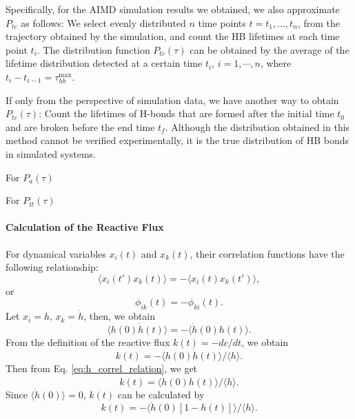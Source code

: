 Specifically, for the AIMD simulation results we obtained, we also approximate $P_{tc}$ as follows: 
We select evenly distributed $n$ time points $t=t_1,...,t_n$, from the trajectory obtained by the simulation, 
and count the HB lifetimes at each time point $t_i$.
The distribution function $P_{tc}(\tau)$ 
can be obtained by the average of the lifetime distribution detected at a certain time $t_i$, $i=1,\cdots, n$, 
where $t_i-t_{i-1} = \tau_{hb}^{\max}$. 

If only from the perspective of simulation data, we have another way to obtain $P_{tc}(\tau)$: 
Count the lifetimes of H-bonds that are formed after the initial time $t_0$ and are broken before the end time $t_f$.
Although the distribution obtained in this method cannot be verified experimentally, 
it is the true distribution of HB bonds in simulated systems. 

For $P_a(\tau)$

For $P_{tt}(\tau)$


\paragraph{Calculation of the Reactive Flux}\label{calc_rf}
For dynamical variables $x_i(t)$ and $x_k(t)$, their correlation functions have the following relationship:\cite{Landau1980}
\begin{equation}
\langle x_i(t') x_k(t)\rangle = -\langle x_i(t) x_k(t')\rangle,
\label{eq:correlation_relation}
\end{equation}
or 
\begin{equation}
\phi_{ik}(t) = -\phi_{ki}(t). \nonumber
\label{eq:correlation_relation2}
\end{equation}
Let $x_i = h$, $x_k = \dot h$,
then, we obtain
\begin{equation}
\langle h(0) \dot{h}(t)\rangle=-\langle\dot{h}(0) h(t)\rangle. 
\label{eq:h_correl_relation}
\end{equation}
From the definition of the reactive flux $k(t) = -dc/dt$, we obtain 
\begin{equation}
k(t)=-\langle h(0) \dot{h}(t)\rangle /\langle h\rangle. 
\label{eq:rf1}
\end{equation}
Then from Eq. \ref{eq:h_correl_relation},
we get 
\begin{equation}
k(t) =  \langle \dot{h}(0)h(t)\rangle /\langle h\rangle. \nonumber
\label{eq:rf2}
\end{equation}
Since $\langle\dot{h}(0)\rangle=0$, $k(t)$ can be calculated by
\begin{equation}
k(t) = - \langle \dot{h}(0)[1-h(t)]\rangle /\langle h\rangle.
\label{eq:rf3}
\end{equation}

